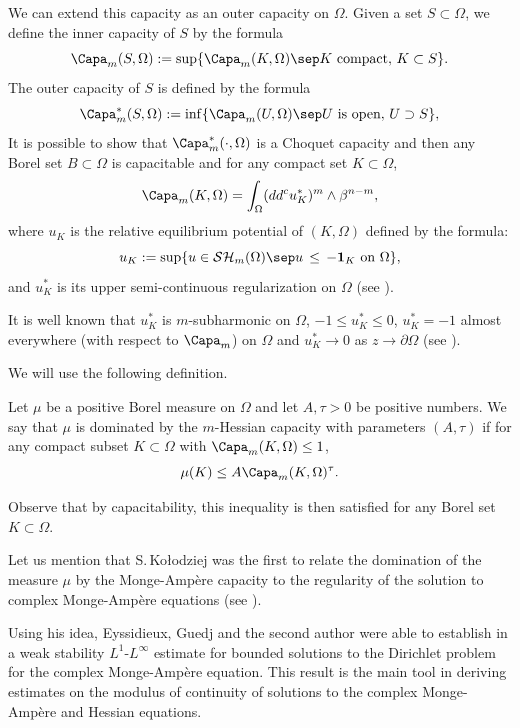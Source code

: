 We can extend this capacity as an outer capacity on $\Omega$. Given a set $S \subset \Omega$, we define the inner capacity of $S$ by the formula
\[
\Capa_m(S,\Omega):= \sup \{\Capa_m(K,\Omega) \sep K \, \, \hbox{compact}, \, K \subset S\}.
\]
The outer capacity of $S$ is defined by the formula
\[
\Capa^*_m(S,\Omega):= \inf \{\Capa_m(U,\Omega) \sep U\text{ is open}, \,U \supset S\},
\]
It is possible to show that $\Capa^*_m(\cdot,\Omega)$ is a Choquet capacity and then any Borel set $ B \subset \Omega$ is capacitable and
for any compact set $K \subset \Omega$,
\begin{equation} \label{eq:cap}
\Capa_m(K,\Omega)=\int_{\Omega}(dd^c u_K^*)^m\wedge\beta^{n-m},
\end{equation}
where $u_K$ is the relative equilibrium potential of $(K,\Omega)$ defined by the formula:
\[
u_K:=\sup\{u\in \mathcal{SH}_m(\Omega) \sep u \, \leq \, -\mathbf{1}_K \text{ on }\Omega\},
\]
and $u_K^*$ is its upper semi-continuous regularization on $\Omega$ (see \cite{Lu12}).

It is well known that $u_K^*$ is $m$-subharmonic on $\Omega$, $- 1 \leq u_K^* \leq 0$, $u_K^*= - 1$ almost everywhere (with respect to $\Capa_m$) on $\Omega$ and $u_K^* \to 0$ as $z \to \partial \Omega$ (see \cite{Lu12}).

We will use the following definition.
\begin{definition} \label{def:cap-domination} Let $\mu$ be a positive Borel measure on $\Omega$ and let $A,\tau > 0$ be positive numbers. We say that $\mu$ is dominated by the $m$-Hessian capacity with parameters $(A,\tau)$ if for any compact subset $K \subset \Omega$ with $\Capa_m (K,\Omega) \leq 1$,
\begin{equation} \label{eq:capdomination}
\mu (K) \leq A \Capa_m (K,\Omega)^{\tau}.
\end{equation}
\end{definition}
Observe that by capacitability, this inequality is then satisfied for any Borel set $K \subset \Omega$.

Let us mention that S.\,Ko\l odziej was the first to relate the domination of the measure $\mu$ by the Monge-Ampère capacity to the regularity of the solution to complex Monge-Ampère equations (see \cite{Kol96}).

Using his idea, Eyssidieux, Guedj and the second author were able to establish in \cite{EGZ09} a weak stability $L^1$-$L^{\infty}$ estimate for bounded solutions to the Dirichlet problem for the complex Monge-Ampère equation. This result is the main tool in deriving estimates on the modulus of continuity of solutions to the complex Monge-Ampère and Hessian equations.

